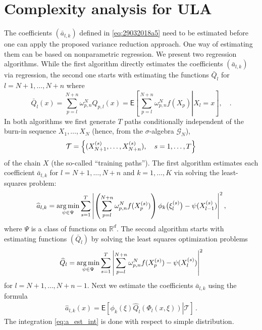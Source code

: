 \documentclass[article]{elsarticle}
\def\NtrainPath{T}
\def\TrainSet{\mathcal{T}}
\newcommand*{\argmin}{\operatornamewithlimits{arg\,min}}
\begin{document}
\section{Complexity analysis for ULA}
\label{sec:coeff}
%
%
The coefficients \((\bar a_{l,k})\) defined in \eqref{eq:29032018a5}  need to be estimated before one can apply the proposed variance reduction approach. One way of estimating them can be based on nonparametric regression.
We present two regression algorithms. While the first algorithm directly estimates  the coefficients \((\bar a_{l,k})\) via regression, the second one starts with estimating the functions $\bar{Q}_{l}$ for $l=N+1,\ldots,N+n$ where
\begin{equation*}
\bar{Q}_{l}(x)=\sum_{p=l}^{N+n} \omega_{p,n}^{N} Q_{p,l}\left(x\right)=\mathsf{E}\left[\left.\sum_{p=l}^{N+n}\omega_{p,n}^{N}f(X_{p})\right|X_{l}=x\right],\quad .
\end{equation*}
In both algorithms we first generate \(\NtrainPath\)  paths conditionally independent of the burn-in sequence $X_1,\dots,X_N$ (hence, from the $\sigma$-algebra $\mathcal{G}_N$),
\[
\TrainSet=\Bigl\{(X^{(s)}_{N+1},\ldots,X^{(s)}_{N+n}),\quad s=1,\ldots,\NtrainPath\Bigr\}
\]
of the chain \(X\)
(the so-called ``training paths'').
The first algorithm estimates each coefficient \(\bar a_{l,k}\) for $l=N+1,\dots, N+n$  and $k=1,\dots,K$  via solving the least-squares problem:
\begin{equation}\label{eq:est_a_direct}
\widehat a_{l,k}=\argmin_{\psi\in \Psi}\sum_{s=1}^{\NtrainPath} \left | \left(\sum_{p=l}^{N+n}\omega_{p,n}^{N}f(X^{(s)}_{p})\right)\phi_k\bigl(\xi^{(s)}_{l}\bigr)-\psi(X^{(s)}_{l-1})\right|^2,
\end{equation}
where \(\Psi\) is a  class of  functions on \(\mathbb{R}^d.\)
The second algorithm starts with estimating  functions \((\bar Q_{l})\) by solving  the least squares optimization problems
\begin{equation}\label{eq:06042018a1}
{\widehat  Q}_{l}=\argmin_{\psi\in \Psi}\sum_{s=1}^{\NtrainPath} \left | \sum_{p=l}^{N+n}\omega_{p,n}^{N}f(X^{(s)}_{p})-\psi(X^{(s)}_{l})\right|^2
\end{equation}
for \(l=N+1,\ldots, N+n-1.\)
Next  we estimate the coefficients \( \bar a_{l,k}\) using
the formula
\begin{eqnarray}
\label{eq:a_est_int}
\widehat a_{l,k}(x)=\mathsf{E}\left[\left.\phi_k\left(\xi\right)\widehat Q_{l}\left(\Phi_l(x,\xi)\right)\right | \TrainSet\right] \,.
\end{eqnarray}
The integration \eqref{eq:a_est_int} is done with respect to simple distribution.
\end{document}
